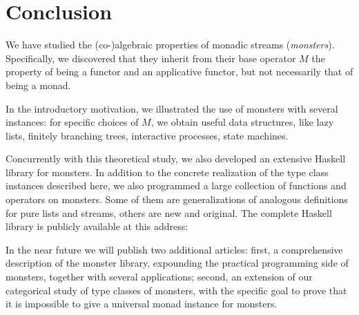 \section{Conclusion}

We have studied the (co-)algebraic properties of monadic streams ({\em monsters}).
Specifically, we discovered that they inherit from their base operator $M$ the property of being a functor and an applicative functor, but not necessarily that of being a monad.

In the introductory motivation, we illustrated the use of monsters with several instances: for specific choices of $M$, we obtain useful data structures, like lazy lists, finitely branching trees, interactive processes, state machines.

Concurrently with this theoretical study, we also developed an extensive Haskell library for monsters.
In addition to the concrete realization of the type class instances described here, we also programmed a large collection of functions and operators on monsters.
Some of them are generalizations of analogous definitions for pure lists and streams, others are new and original.
The complete Haskell library is publicly available at this address:
\begin{center}\repourl\end{center}

In the near future we will publish two additional articles:
first, a comprehensive description of the monster library, expounding the practical programming side of monsters, together with several applications;
second, an extension of our categorical study of type classes of monsters, with the specific goal to prove that it is impossible to give a universal monad instance for monsters.
